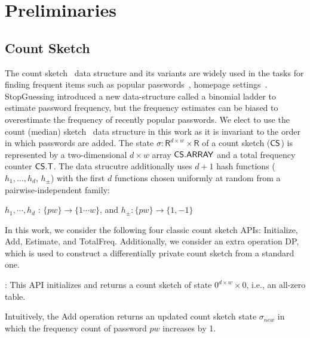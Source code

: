


\vspace*{-\baselineskip}
\section{Preliminaries} \label{section:Prelinmaries}



\subsection{Count Sketch}\label{section:Prelinmaries-CountSketch} %

The count sketch~\cite{ICALP:ChaCheFar02} data structure and its variants are widely used in the tasks for finding frequent items such as popular passwords~\cite{CCS:NaoPinRon19}, homepage settings~\cite{CCS:ErlPihKor14}. StopGuessing\cite{EuroSP:THS19} introduced a new data-structure called a binomial ladder to estimate password frequency, but the frequency estimates can be biased to overestimate the frequency of recently popular passwords. We elect to use the count (median) sketch~\cite{ICALP:ChaCheFar02} data structure in this work as it is invariant to the order in which passwords are added. The state $\sigma: \mathsf{R}^{d\times w} \times \mathsf{R}$ of a count sketch ($\mathsf{CS}$) is represented by a two-dimensional $d\times w$ array $\mathsf{CS.ARRAY}$ and a total frequency counter $\mathsf{CS.T}$. The data strucutre additionally uses $d+1$ hash functions ($h_1, \ldots, h_d$, $h_{\pm}$) with the first $d$ functions chosen uniformly at random from a pairwise-independent family:  
	\begin{center}
		$h_1, \cdots, h_d$ : $\{pw\} \rightarrow \{1\cdots w\}$, and $h_{\pm} : \{pw\} \rightarrow \{1, -1\}$\\
	\end{center}
	
In this work, we consider the following four classic count sketch APIs: Initialize, Add, Estimate, and TotalFreq. Additionally, we consider an extra operation DP, which is used to construct a differentially private count sketch from a standard one.


: This API initializes and returns a count sketch of state $0^{d\times w}\times 0$, i.e., an all-zero table.


 Intuitively, the Add operation returns an updated count sketch state $\sigma_{new}$ in which the frequency count of password $pw$ increases by 1.

